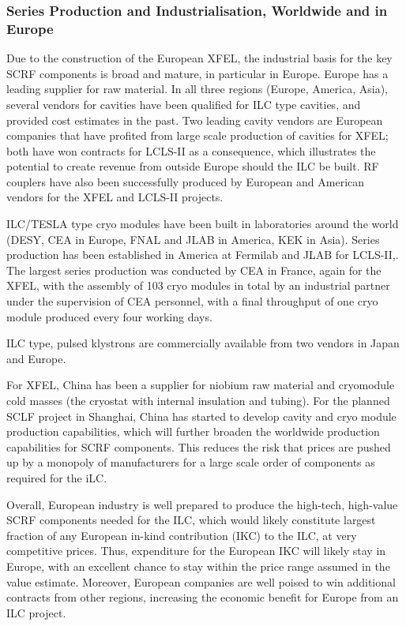 
\subsubsection{Series Production and Industrialisation, Worldwide and in Europe}

Due to the construction of the European XFEL, the industrial basis for the key SCRF components is broad and mature, in particular in Europe.
Europe has a leading supplier for raw material. 
In all three regions (Europe, America, Asia), several vendors for cavities have been qualified for ILC type cavities, and provided cost estimates in the past.
Two leading cavity vendors are European companies that have profited from large scale production of cavities for XFEL; 
both have won contracts for LCLS-II as a consequence, which illustrates the potential to create revenue from outside Europe should the ILC be built.
RF couplers have also been successfully produced by European and  American vendors for the XFEL and LCLS-II projects.

ILC/TESLA type cryo modules have been built in laboratories around the world (DESY, CEA in Europe, FNAL and JLAB in America, KEK in Asia).
Series production has been established in America at Fermilab and JLAB for LCLS-II,.
The largest series production was conducted by CEA in France, again for the XFEL, with the assembly of \num{103} cryo modules in total by an industrial partner under the supervision of CEA personnel, with a final throughput of one cryo module produced every four working days.

ILC type, pulsed  klystrons are commercially available from two vendors in Japan and Europe.

For XFEL, China has been a supplier for niobium raw material and cryomodule cold masses (the cryostat with internal insulation and tubing).
For the planned SCLF project in Shanghai, China has started to develop cavity and cryo module production capabilities, which will further broaden the worldwide production capabilities for SCRF components.
This reduces the risk that prices are pushed up by a monopoly of manufacturers for a large scale order of components as required for the iLC.

Overall, European industry is well prepared to produce the high-tech, high-value SCRF components needed for the ILC, which would likely constitute largest fraction of any European in-kind contribution (IKC) to the ILC, at very competitive prices.
Thus, expenditure for the European IKC will likely stay in Europe, with an excellent chance to stay within the price range assumed in the value estimate.
Moreover, European companies are well poised to win additional contracts from other regions, increasing the economic benefit for Europe from an ILC project.



